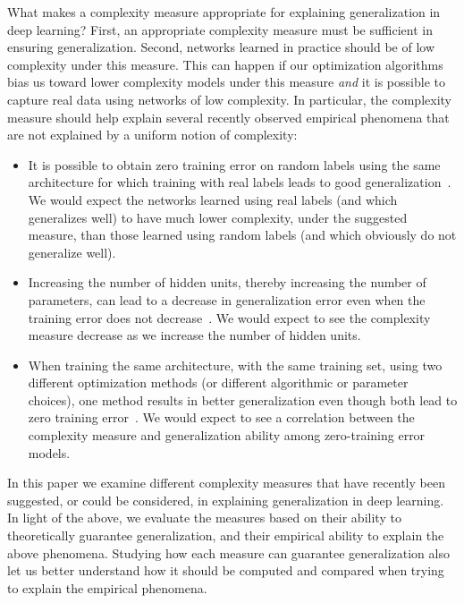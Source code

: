 \documentclass{article}
\begin{document}
What makes a complexity measure appropriate for explaining
generalization in deep learning?  First, an appropriate complexity
measure must be sufficient in ensuring generalization.  Second,
networks learned in practice should be of low complexity under this
measure.  This can happen if our optimization algorithms bias us
toward lower complexity models under this measure {\em and} it is
possible to capture real data using networks of low complexity.  In
particular, the complexity measure should help explain several
recently observed empirical phenomena that are not explained by a
uniform notion of complexity:
\begin{itemize}
\item It is possible to obtain zero training error on random labels
  using the same architecture for which training with real labels
  leads to good generalization~\cite{zhang2017understanding}.  We
  would expect the networks learned using real labels (and which
  generalizes well) to have much lower complexity, under the suggested
  measure, than those learned using random labels (and which obviously
  do not generalize well).
\item Increasing the number of hidden units, thereby increasing the
  number of parameters, can lead to a decrease in generalization error
  even when the training error does not decrease~\cite{neyshabur15b}.
  We would expect to see the complexity measure decrease as we
  increase the number of hidden units.
\item When training the same architecture, with the same training set,
  using two different optimization methods (or different algorithmic
  or parameter choices), one method results in better generalization
  even though both lead to zero training
  error~\cite{NeySalSre15,keskar2016large}.  We would expect to see a
  correlation between the complexity measure and generalization
  ability among zero-training error models.
\end{itemize}
In this paper we examine different complexity measures that have
recently been suggested, or could be considered, in explaining
generalization in deep learning.  In light of the above, we evaluate
the measures based on their ability to theoretically guarantee
generalization, and their empirical ability to explain the above
phenomena.  Studying how each measure can guarantee generalization also
let us better understand how it should be computed and compared when
trying to explain the empirical phenomena.
\end{document}
